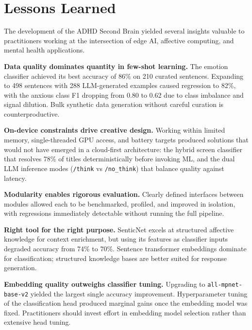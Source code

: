 \section{Lessons Learned}
\label{sec:lessons-learned}

The development of the ADHD Second Brain yielded several insights valuable to practitioners working at the intersection of edge AI, affective computing, and mental health applications.

\textbf{Data quality dominates quantity in few-shot learning.} The emotion classifier achieved its best accuracy of 86\% on 210 curated sentences. Expanding to 498 sentences with 288 LLM-generated examples caused regression to 82\%, with the anxious class F1 dropping from 0.80 to 0.62 due to class imbalance and signal dilution. Bulk synthetic data generation without careful curation is counterproductive.

\textbf{On-device constraints drive creative design.} Working within limited memory, single-threaded GPU access, and battery targets produced solutions that would not have emerged in a cloud-first architecture: the hybrid screen classifier that resolves 78\% of titles deterministically before invoking ML, and the dual LLM inference modes (\texttt{/think} vs \texttt{/no\_think}) that balance quality against latency.

\textbf{Modularity enables rigorous evaluation.} Clearly defined interfaces between modules allowed each to be benchmarked, profiled, and improved in isolation, with regressions immediately detectable without running the full pipeline.

\textbf{Right tool for the right purpose.} SenticNet excels at structured affective knowledge for context enrichment, but using its features as classifier inputs degraded accuracy from 74\% to 70\%. Sentence transformer embeddings dominate for classification; structured knowledge bases are better suited for response generation.

\textbf{Embedding quality outweighs classifier tuning.} Upgrading to \texttt{all-mpnet-base-v2} yielded the largest single accuracy improvement. Hyperparameter tuning of the classification head produced marginal gains once the embedding model was fixed. Practitioners should invest effort in embedding model selection rather than extensive head tuning.

